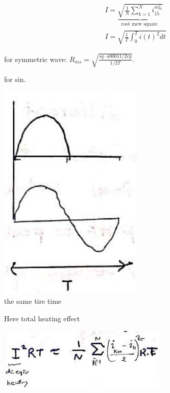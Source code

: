 \documentclass[12pt, a4paper]{article}
\newcommand{\figwidth}{8cm}
\begin{document}
	$$
		\begin{aligned}
			 & I=\underbrace{\sqrt{\frac{1}{N} \sum_{k=1}^{N} i_{15}^{m_{m}^{2}}}}_{\text {root mew square }} \\
			 & I=\sqrt{\frac{1}{T} \int_{0}^{T} i(t)^{2} d t}
		\end{aligned}
	$$

	for symmetric wave: $R_{m s}=\sqrt{\frac{s q \cdot a 00011 / 2 c y}{1 / 2 T}}$.

	for sin.

	\includegraphics[max width=\textwidth, center]{2024_06_15_74bbabba7981675b0d49g-01}\\
	the same tire time

	Here total heating effect

	\begin{center}
		\includegraphics[max width=\figwidth]{2024_06_15_74bbabba7981675b0d49g-01(2)}
	\end{center}
\end{document}
